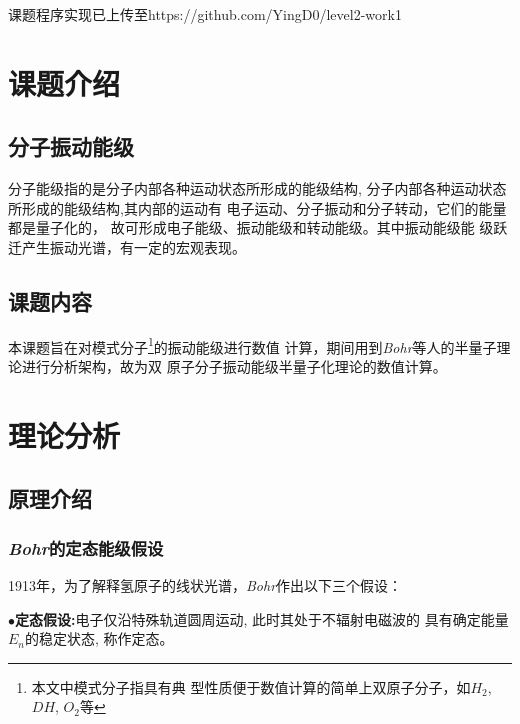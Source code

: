 \documentclass[11pt, a4paper, oneside]{ctexart}
\begin{document}
\vspace{45mm}\begin{center}
    \small{课题程序实现已上传至}\footnotesize{https://github.com/YingD0/level2-work1}
        
\end{center}

\newpage
{}
\setcounter{page}{1}
\tableofcontents
\newpage
\setcounter{page}{1}

\section{课题介绍}
\subsection{分子振动能级}
{分子能级指的是分子内部各种运动状态所形成的能级结构,
分子内部各种运动状态所形成的能级结构,其内部的运动有
电子运动、分子振动和分子转动，它们的能量都是量子化的，
故可形成电子能级、振动能级和转动能级。其中振动能级能
级跃迁产生振动光谱，有一定的宏观表现。%
\subsection{课题内容}
{本课题旨在对模式分子\footnote{本文中模式分子指具有典
型性质便于数值计算的简单上双原子分子，如$H_2$,  $ DH $,  $O_2$等}的振动能级进行数值
计算，期间用到\emph{Bohr}等人的半量子理论进行分析架构，故为双
原子分子振动能级半量子化理论的数值计算。}
\newpage
\section{理论分析}
\subsection{原理介绍}
\subsubsection{\emph{Bohr}的定态能级假设}
{1913年，为了解释氢原子的线状光谱，\emph{Bohr}作出以下三个假设：
}


\setlength{\parindent}{3em}
{
$\bullet${\bfseries{定态假设:}}{电子仅沿特殊轨道圆周运动, 此时其处于不辐射电磁波的
具有确定能量$E_n$的稳定状态, 称作定态。}


}}
\end{document}
